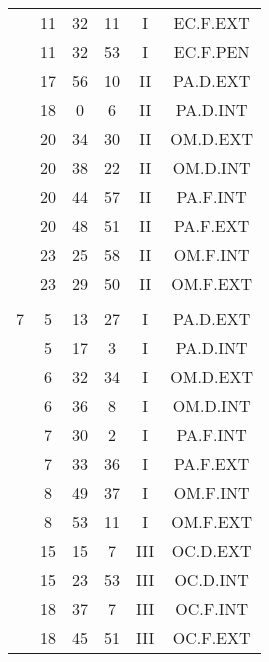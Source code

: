 \documentclass[12pt, a4paper]{article}
\begin{document}
\begin{multicols}{3}
{\begin{tabular}{c c c c c c}
	 	 	 	 & 11 & 32 & 11 & I & EC.F.EXT\\%
	 	 	 	 & 11 & 32 & 53 & I & EC.F.PEN\\%
	 	 	 	 & 17 & 56 & 10 & II & PA.D.EXT\\%
	 	 	 	 & 18 & 0 & 6 & II & PA.D.INT\\%
	 	 	 	 & 20 & 34 & 30 & II & OM.D.EXT\\%
	 	 	 	 & 20 & 38 & 22 & II & OM.D.INT\\%
	 	 	 	 & 20 & 44 & 57 & II & PA.F.INT\\%
	 	 	 	 & 20 & 48 & 51 & II & PA.F.EXT\\%
	 	 	 	 & 23 & 25 & 58 & II & OM.F.INT\\%
	 	 	 	 & 23 & 29 & 50 & II & OM.F.EXT\\%
	 	 	 	 & & & & & \\%
	 	 	 	7 & 5 & 13 & 27 & I & PA.D.EXT\\%
	 	 	 	 & 5 & 17 & 3 & I & PA.D.INT\\%
	 	 	 	 & 6 & 32 & 34 & I & OM.D.EXT\\%
	 	 	 	 & 6 & 36 & 8 & I & OM.D.INT\\%
	 	 	 	 & 7 & 30 & 2 & I & PA.F.INT\\%
	 	 	 	 & 7 & 33 & 36 & I & PA.F.EXT\\%
	 	 	 	 & 8 & 49 & 37 & I & OM.F.INT\\%
	 	 	 	 & 8 & 53 & 11 & I & OM.F.EXT\\%
	 	 	 	 & 15 & 15 & 7 & III & OC.D.EXT\\%
	 	 	 	 & 15 & 23 & 53 & III & OC.D.INT\\%
	 	 	 	 & 18 & 37 & 7 & III & OC.F.INT\\%
	 	 	 	 & 18 & 45 & 51 & III & OC.F.EXT\\%

\end{tabular}}
\end{multicols}
\end{document}
